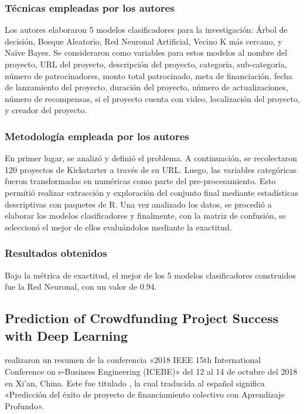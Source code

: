 \subsubsection{Técnicas empleadas por los autores}
Los autores elaboraron 5 modelos clasificadores para la investigación: Árbol de decisión, Bosque Aleatorio, Red Neuronal Artificial, Vecino K más cercano, y Naïve Bayes. Se consideraron como variables para estos modelos al nombre del proyecto, URL del proyecto, descripción del proyecto, categoría, sub-categoría, número de patrocinadores, monto total patrocinado, meta de financiación, fecha de lanzamiento del proyecto, duración del proyecto, número de actualizaciones, número de recompensas, si el proyecto cuenta con video, localización del proyecto, y creador del proyecto.

\subsubsection{Metodología empleada por los autores}
En primer lugar, se analizó y definió el problema. A continuación, se recolectaron 120 proyectos de Kickstarter a través de su URL. Luego, las variables categóricas fueron transformadas en numéricas como parte del pre-procesamiento. Esto permitió realizar extracción y exploración del conjunto final mediante estadísticas descriptivas con paquetes de R. Una vez analizado los datos, se procedió a elaborar los modelos clasificadores y finalmente, con la matriz de confusión, se seleccionó el mejor de ellos evaluándolos mediante la exactitud.

\subsubsection{Resultados obtenidos}
Bajo la métrica de exactitud, el mejor de los 5 modelos clasificadores construidos fue la Red Neuronal, con un valor de 0.94.

\subsection{Prediction of Crowdfunding Project Success with Deep Learning \citep*{pr_yu2018deeplearning}}
\citeauthor{pr_yu2018deeplearning} realizaron un resumen de la conferencia «2018 IEEE 15th International Conference on e-Business Engineering (ICEBE)» del 12 al 14 de octubre del 2018 en Xi'an, China. Este fue titulado , la cual traducida al español significa «Predicción del éxito de proyecto de financiamiento colectivo con Aprendizaje Profundo».

